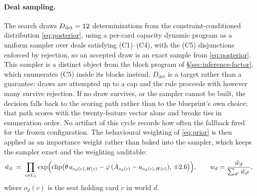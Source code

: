 \paragraph{Deal sampling.} The search draws $D_{\mathrm{det}} = \texttt{12{}}$
determinizations from the constraint-conditioned distribution \eqref{eq:posterior}, using a
per-card capacity dynamic program as a uniform sampler over deals satisfying (C1)--(C4), with the
(C5) disjunctions enforced by rejection, so an accepted draw is an exact sample from
\eqref{eq:posterior}. This sampler is a distinct object from the block program of \S\ref{sec:inference-factor},
which enumerates (C5) inside its blocks instead. $D_{\mathrm{det}}$ is a target rather than a
guarantee: draws are attempted up to a cap and the rule proceeds with however many survive
rejection. If no draw survives, or the sampler cannot be built, the decision falls back to the
\vfive{} scoring path rather than to the blueprint's own choice; that path scores with the
twenty-feature vector alone and breaks ties in enumeration order. No artifact of this cycle
records how often the fallback fired for the frozen configuration. The behavioural weighting of \eqref{eq:prior} is then applied as an
importance weight rather than baked into the sampler, which keeps the sampler exact and the
weighting auditable:
\begin{equation}
  \tilde w_d \;=\; \prod_{c \in U_t} \exp\Bigl(\operatorname{clip}\bigl(\theta\, a_{o_d(c),H(c)}
  - \varphi\,(A_{o_d(c)} - a_{o_d(c),H(c)}),\, \pm 2.6\bigr)\Bigr),
  \qquad
  w_d = \frac{\tilde w_d}{\sum_{d'} \tilde w_{d'}},
  \label{eq:iw}
\end{equation}
where $o_d(c)$ is the seat holding card $c$ in world $d$.


